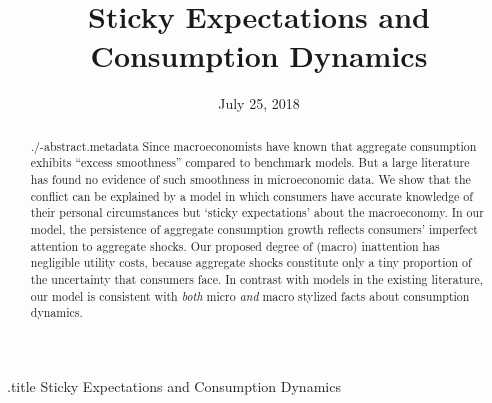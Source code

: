 \documentclass[titlepage]{\econtex}\newcommand{\texname}{cAndCwithStickyE}
\begin{document}




\begin{verbatimwrite}{\jobname.title}
Sticky Expectations and Consumption Dynamics
\end{verbatimwrite}

\hfill{\tiny \jobname}

\title{Sticky Expectations and \\ Consumption Dynamics}




\date{July 25, 2018}
\maketitle

\begin{abstract}
  \begin{verbatimwrite}{./\jobname-abstract.metadata}
    Since \cite{cdSmooth} macroeconomists have known that aggregate consumption exhibits ``excess smoothness'' compared to benchmark models.  But a large literature has found no evidence of such smoothness in microeconomic data.  We show that the conflict can be explained by a model in which consumers have accurate knowledge of their personal circumstances but `sticky expectations' about the macroeconomy. In our model, the persistence of aggregate consumption growth reflects consumers' imperfect attention to aggregate shocks. Our proposed degree of (macro) inattention has negligible utility costs, because aggregate shocks constitute only a tiny proportion of the uncertainty that consumers face.  In contrast with models in the existing literature, our model is consistent with {\it both} micro {\it and} macro stylized facts about consumption dynamics.
  \end{verbatimwrite}
  
\end{abstract}
\end{document}
